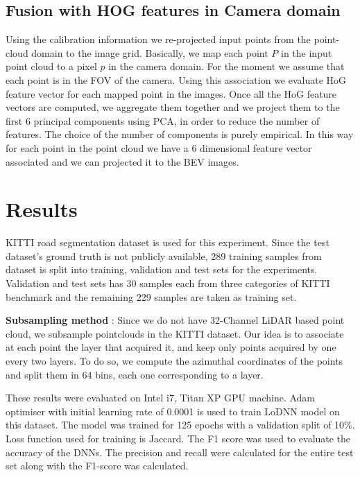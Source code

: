 \documentclass[10pt,twocolumn,letterpaper]{article}
\begin{document}
\subsection{Fusion with HOG features in Camera domain}
Using the calibration information we re-projected input points from the point-cloud domain to the image grid. Basically, we map each point $P$ in the input point cloud to a pixel $p$ in the camera domain. For the moment we  assume that each point is in the FOV of the camera. Using this association we evaluate HoG feature vector for each mapped point in the images. Once all the HoG feature vectors are computed, we aggregate them together and we project them to the first $6$ principal components using PCA, in order to reduce the number of features. The choice of the number of components is purely empirical. In this way for each point in the point cloud we have a $6$ dimensional feature vector associated and we can projected it to the BEV images.

\section{Results}
KITTI road segmentation dataset \cite{Fritsch2013ITSC} is used for this experiment. Since the test dataset's ground truth is not publicly available, 289 training samples from dataset is split into training, validation and test sets for the experiments. Validation and test sets has 30 samples each from three categories of KITTI benchmark and the remaining 229 samples are taken as training set.

\textbf{Subsampling method} :
Since we do not have 32-Channel LiDAR based point cloud, we subsample pointclouds in the KITTI dataset. Our idea is to associate at each point the layer that acquired it, and keep only points acquired by one every two layers. To do so, we compute the azimuthal coordinates of the points and split them in $64$ bins, each one corresponding to a layer. 

\noindent  These results were evaluated  on Intel i7, Titan XP GPU machine. Adam optimiser with initial learning rate of 0.0001 is used to train LoDNN model on this dataset. The model was trained for 125 epochs with a validation split of 10\%. Loss function used for training is Jaccard. The F1 score\cite{Fritsch2013ITSC} was used to evaluate the accuracy of the DNNs. The precision and recall were calculated for the entire test set along with the F1-score was calculated.
\end{document}
